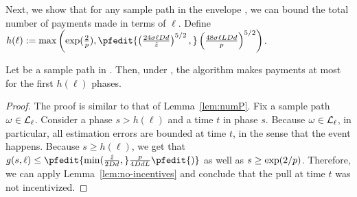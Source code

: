 Next, we show that for any sample path \SP in the envelope \Env{\ell},
we can bound the total number of payments made in terms of $\ell$.
Define $h(\ell) := \max \left( \exp(\frac{2}{\MinProb}),
\pfedit{
\left( \frac{24 \sigma \ell \Diam d}{\TieCutoff} \right)^{5/2},
}
\left( \frac{48 \sigma \ell \TieDensity \Diam d}{\MinProb} \right)^{5/2}
\right)$.

\begin{lemma} \label{lem:envelope-payments}
Let \SP be a sample path in \Env{\ell}.
Then, under \SP, the algorithm makes payments at most for the first 
$h(\ell)$ phases. 
\end{lemma}

\begin{proof}
The proof is similar to that of Lemma~\ref{lem:numP}.
Fix a sample path $\omega \in {\mathcal L}_{\ell}$.
Consider a phase $s > h(\ell)$ and a time $t$ in phase $s$.
Because $\omega \in {\mathcal L}_{\ell}$, in particular, all estimation errors are
bounded at time $t$, in the sense that the event 
happens.
Because $s \geq h(\ell)$, we get that
$g(s,\ell) \leq \pfedit{\min(\frac{\TieCutoff}{2\Diam d},} \frac{\MinProb}{4 \Diam d \TieDensity}\pfedit{)}$
as well as $s \geq \exp(2/p)$.
Therefore, we can apply Lemma~\ref{lem:no-incentives} and conclude
that the pull at time $t$ was not incentivized.
\end{proof}

